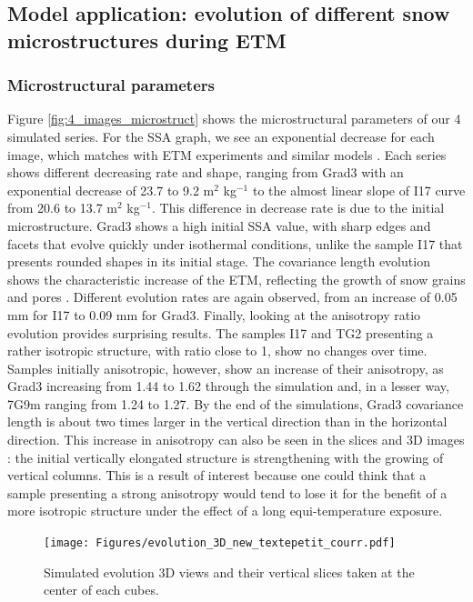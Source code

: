 \documentclass[draft,ms]{agujournal2019}
\begin{document}
\subsection{Model application: evolution of different snow microstructures during ETM}

\subsubsection{Microstructural parameters}

Figure \ref{fig:4_images_microstruct} shows the microstructural parameters of our 4 simulated series. For the SSA graph, we see an exponential decrease for each image, which matches with ETM experiments and similar models \cite{vetter_simulating_2010, kaempfer_observation_2007}. Each series shows different decreasing rate and shape, ranging from Grad3 with an exponential decrease of 23.7 to 9.2 m$^2$ kg$^{-1}$ to the almost linear slope of I17 curve from 20.6 to 13.7 m$^2$ kg$^{-1}$. This difference in decrease rate  is due to the initial microstructure. Grad3 shows a high initial SSA value, with sharp edges and facets that evolve quickly under isothermal conditions, unlike the sample I17 that presents rounded shapes in its initial stage.
The covariance length evolution shows the characteristic increase of the ETM, reflecting the growth of snow grains and pores \cite{lowe2011interfacial, calonne_study_2014}. Different evolution rates are again observed, from an increase of 0.05 mm for I17 to 0.09 mm for Grad3. Finally, looking at the anisotropy ratio evolution provides surprising results. The samples I17 and TG2 presenting a rather isotropic structure, with ratio close to 1, show no changes over time. Samples initially anisotropic, however, show an increase of their anisotropy, as Grad3 increasing from 1.44 to 1.62 through the simulation and, in a lesser way, 7G9m ranging from 1.24 to 1.27. By the end of the simulations, Grad3 covariance length is about two times larger in the vertical direction than in the horizontal direction. This increase in anisotropy can also be seen in the slices and 3D images : the initial vertically elongated structure is strengthening with the growing of vertical columns. This is a result of interest because one could think that a sample presenting a strong anisotropy would tend to lose it for the benefit of a more isotropic structure under the effect of a long equi-temperature exposure.

\begin{figure}
    \centering
    \texttt{[image: Figures/evolution\_3D\_new\_textepetit\_courr.pdf]}
    \caption{Simulated evolution 3D views and their vertical slices taken at the center of each cubes.}
    \label{fig:evolutions_3D}
\end{figure}
\end{document}
